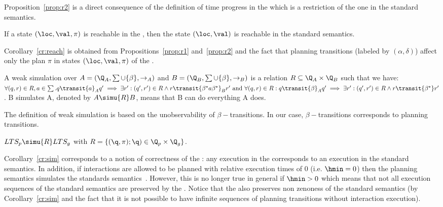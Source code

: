 Proposition~\ref{prop:r2} is a direct consequence of the definition of time progress in the \lps which is a restriction of the one in the standard semantics.

\begin{corollary}\label{cr:reach}
If a state $(\loc,\val,\pi)$ is reachable in the \lpsb, then the state $(\loc,\val)$ is reachable in the standard semantics.
\end{corollary}

Corollary~\ref{cr:reach} is obtained from Propositions~\ref{prop:r1} and~\ref{prop:r2} and the fact that planning transitions (labeled by $(\alpha,\delta)$) affect only the plan $\pi$ in states $(\loc,\val,\pi)$ of the \lpsabr.

\begin{definition}
  A weak simulation over $A=(\Q_A,\sum\cup\{\beta\},\to_A)$ and $B=(\Q_B,\sum\cup\{\beta\},
  \to_B)$ is a relation $R\subseteq \Q_A\times \Q_B$ such that we have: 
  $\forall(q,r)\in R, a\in \sum .q\transit{a}_A q' \implies\exists r':(q',r')\in R\wedge r\transit{
  \beta^*a\beta^*}_B r' \text{ and } \forall(q,r)\in R: q\transit{\beta}_Aq'\implies\exists r':
  (q',r')\in R\wedge r\transit{\beta^*}r'$.
  B simulates A, denoted by $A\simu{R}B$, means that B can do everything A does.
\end{definition}
The definition of weak simulation is based on the unobservability of $\beta-$transitions. In our case, $\beta-$transitions corresponds to planning transitions.
\begin{corollary}\label{cr:sim}
  $LTS_p\simu{R} LTS_g$ with $R=\{(\q,\pi);\q)\in\Q_p\times\Q_g\}$.
\end{corollary}

Corollary~\ref{cr:sim} corresponds to a notion of correctness of the \lpsb: any execution in the \lpsabr corresponds to an execution in the standard semantics.
In addition, if interactions are allowed to be planned with relative execution times of $0$ (i.e. $\hmin = 0$) then the planning semantics simulates the standards semantics~\cite{FM:plan}.
However, this is no longer true in general if  $\hmin > 0$ which means that not all execution sequences of the standard semantics are preserved by the \lps.
Notice that the \lps also preserves non zenoness of the standard semantics
(by Corollary~\ref{cr:sim} and the fact that it is not possible to have infinite sequences of planning transitions without interaction execution).


